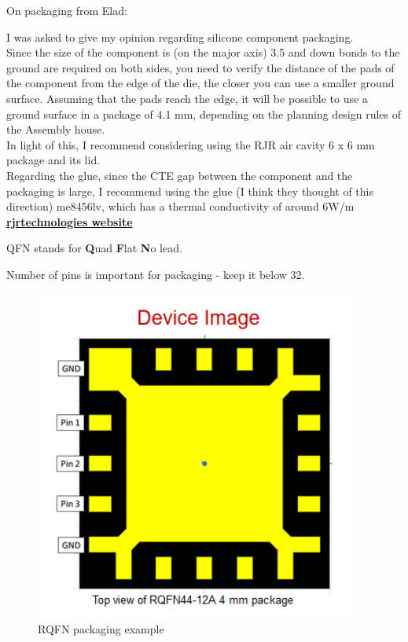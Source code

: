 \documentclass{article}
\begin{document}
On packaging from Elad:

\begin{info}
	I was asked to give my opinion regarding silicone component packaging.\\
	Since the size of the component is (on the major axis) 3.5 and down bonds to the ground are required on both sides, you need to verify the distance of the pads of the component from the edge of the die, the closer you can use a smaller ground surface. Assuming that the pads reach the edge, it will be possible to use a ground surface in a package of  4.1 \unit{mm}, depending on the planning design rules of the Assembly house. \\
	In light of this, I recommend considering using the RJR air cavity 6 x 6 \unit{mm} package and its lid. \\
	Regarding the glue, since the CTE gap between the component and the packaging is large, I recommend using the glue (I think they thought of this direction) me8456lv, which has a thermal conductivity of around 6W/m \\
	\href{https://www.rjrtechnologies.com/}{\textbf{rjrtechnologies website}}
\end{info}

QFN stands for \textbf{Q}uad \textbf{F}lat \textbf{N}o lead.

Number of pins is important for packaging - keep it below 32.



\begin{figure}[ht!]
	\centering %
	\includegraphics[width=0.5\linewidth]{Figures/RQFN-4-mm.png}
	\caption{RQFN packaging example }
	\label{fig:rqfn-example}
\end{figure}
\end{document}
